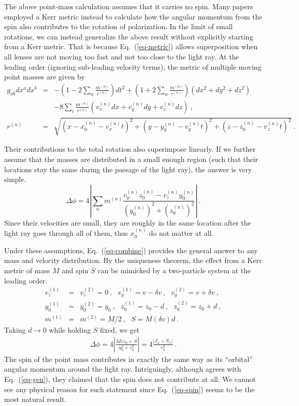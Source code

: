 \documentclass[aps,showpacs,onecolumn,floats,prd,superscriptaddress,nofootinbib]{revtex4}
\begin{document}
The above point-mass calculation assumes that it carries no spin. 
Many papers employed a Kerr metric instead to calculate how the angular momentum from the spin also contributes to the rotation of polarization. 
In the limit of small rotations, we can instead generalize the above result without explicitly starting from a Kerr metric. 
That is because Eq.~(\ref{eq-metric}) allows superposition when all lenses are not moving too fast and not too close to the light ray. 
At the leading order (ignoring sub-leading velocity terms), the metric of multiple moving point masses are given by
\begin{eqnarray}
g_{ab}dx^adx^b &=& -\left( 1 - 2\sum_n \frac{m^{(n)}}{r^{(n)}} \right)dt^2
+\left( 1 + 2\sum_n \frac{m^{(n)}}{r^{(n)}} \right)(dx^2+dy^2+dz^2)
\\ \nonumber 
& & -8\sum_i \frac{m^{(n)} }{r^{(n)}}
\left(v^{(n)}_x dx + v^{(n)}_y dy+ v^{(n)}_z dz\right)~, \\
r^{(n)} &=& \sqrt{\left(x - x_0^{(n)} - v^{(n)}_x t\right)^2 + \left(y - y_0^{(n)} - v^{(n)}_y t\right)^2 
+ \left(z - z_0^{(n)} - v^{(n)}_z t\right)^2}~.
\end{eqnarray}

Their contributions to the total rotation also superimpose linearly. 
If we further assume that the masses are distributed in a small enough region (such that their locations stay the same during the passage of the light ray), the answer is very simple. 
\begin{equation}
\Delta\phi = 4 \left| \sum_n m^{(n)} \frac{v_y^{(n)}z_0^{(n)} - v_z^{(n)}y_0^{(n)}}
{\left(y_0^{(n)}\right)^2+\left(z_0^{(n)}\right)^2} \right|~.
\label{eq-combine}
\end{equation}
Since their velocities are small, they are roughly in the same location after the light ray goes through all of them, thus $x_0^{(n)}$ do not matter at all. 

Under these assumptions, Eq.~(\ref{eq-combine}) provides the general answer to any mass and velocity distribution. 
By the uniqueness theorem, the effect from a Kerr metric of mass $M$ and spin $S$ can be mimicked by a two-particle system at the leading order.
\begin{eqnarray}
v_z^{(1)} &=& v_z^{(2)} = 0~,  \ \ \ v_y^{(1)} = v -\delta v~, \ \ \ v_y^{(2)} = v + \delta v~, \nonumber \\
y_0^{(1)} &=& y_0^{(2)} = y_0~, \ \ \ z_0^{(1)} = z_0-d~, \ \ \ z_0^{(2)} = z_0 + d~, \\
m^{(1)} &=& m^{(2)} = M/2~, \ \ \ S = M (\delta v) d~. \nonumber
\end{eqnarray}
Taking $d\rightarrow0$ while holding $S$ fixed, we get
\begin{eqnarray}
\Delta \phi = 4\left|\frac{Mvz_0 + S}{y_0^2 + z_0^2}\right| = 4 \frac{\left| J_x + S_x \right|}{r_0^2}~.
\label{eq-spin}
\end{eqnarray}
The spin of the point mass contributes in exactly the same way as its ``orbital'' angular momentum around the light ray. Intriguingly, although \cite{KopMas01} agrees with Eq.~(\ref{eq-gen}), they claimed that the spin does not contribute at all. We cannot see any physical reason for such statement since Eq.~(\ref{eq-spin}) seems to be the most natural result.
\end{document}
